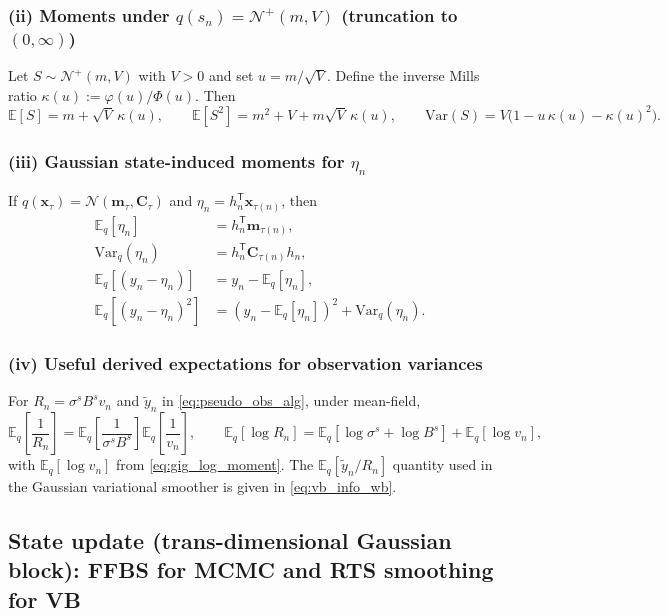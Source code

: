 \documentclass[11pt]{article}
\newcommand{\1}{\mathbb{I}}
\newcommand{\N}{\mathcal{N}}
\newcommand{\T}{\mathsf{T}}
\newcommand{\phiN}[1]{\varphi\!\left(#1\right)}
\newcommand{\PhiN}[1]{\Phi\!\left(#1\right)}
\newcommand{\E}{\mathbb{E}}
\newcommand{\Var}{\mathrm{Var}}
\begin{document}
\subsubsection*{(ii) Moments under $q(s_n)=\N^+(m,V)$ (truncation to $(0,\infty)$)}
Let $S\sim\N^+(m,V)$ with $V>0$ and set $u=m/\sqrt{V}$.
Define the inverse Mills ratio $\kappa(u):=\phiN{u}/\PhiN{u}$.
Then
\begin{equation}
\E[S]=m+\sqrt{V}\,\kappa(u),
\qquad
\E[S^2]=m^2+V+m\sqrt{V}\,\kappa(u),
\qquad
\Var(S)=V\Big(1-u\,\kappa(u)-\kappa(u)^2\Big).
\label{eq:truncnorm_moments}
\end{equation}

\subsubsection*{(iii) Gaussian state-induced moments for $\eta_n$}
	If $q(\bm x_\tau)=\N(\bm m_\tau,\bm C_\tau)$ and $\eta_n=h_n^\T \bm x_{\tau(n)}$, then
	\begin{equation}
	\begin{aligned}
	\E_q[\eta_n] &= h_n^\T \bm m_{\tau(n)},\\
	\Var_q(\eta_n) &= h_n^\T \bm C_{\tau(n)} h_n,\\
	\E_q[(y_n-\eta_n)] &= y_n-\E_q[\eta_n],\\
	\E_q[(y_n-\eta_n)^2] &= (y_n-\E_q[\eta_n])^2+\Var_q(\eta_n).
	\end{aligned}
	\label{eq:eta_moments}
	\end{equation}

\subsubsection*{(iv) Useful derived expectations for observation variances}
For $R_n=\sigma^s B^s v_n$ and $\tilde y_n$ in \eqref{eq:pseudo_obs_alg}, under mean-field,
\begin{equation}
\E_q\!\left[\frac{1}{R_n}\right]=\E_q\!\left[\frac{1}{\sigma^s B^s}\right]\E_q\!\left[\frac{1}{v_n}\right],
\qquad
\E_q[\log R_n]=\E_q[\log\sigma^s+\log B^s]+\E_q[\log v_n],
\label{eq:R_moments}
\end{equation}
with $\E_q[\log v_n]$ from \eqref{eq:gig_log_moment}.
The $\E_q[\tilde y_n/R_n]$ quantity used in the Gaussian variational smoother is given in \eqref{eq:vb_info_wb}.

\subsection{State update (trans-dimensional Gaussian block): FFBS for MCMC and RTS smoothing for VB}
\label{sec:state_ffbs_vb}
\end{document}
